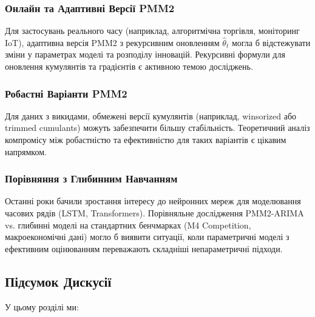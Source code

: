 \documentclass[12pt,a4paper]{article}
\begin{document}
	\subsubsection{Онлайн та Адаптивні Версії PMM2}
	
	Для застосувань реального часу (наприклад, алгоритмічна торгівля, моніторинг IoT), адаптивна версія PMM2 з рекурсивним оновленням $\hat{\theta}_t$ могла б відстежувати зміни у параметрах моделі та розподілу інновацій. Рекурсивні формули для оновлення кумулянтів та градієнтів є активною темою досліджень.
	
	\subsubsection{Робастні Варіанти PMM2}
	
	Для даних з викидами, обмежені версії кумулянтів (наприклад, winsorized або trimmed cumulants) можуть забезпечити більшу стабільність. Теоретичний аналіз компромісу між робастністю та ефективністю для таких варіантів є цікавим напрямком.
	
	\subsubsection{Порівняння з Глибинним Навчанням}
	
	Останні роки бачили зростання інтересу до нейронних мереж для моделювання часових рядів (LSTM, Transformers). Порівняльне дослідження PMM2-ARIMA vs. глибинні моделі на стандартних бенчмарках (M4 Competition, макроекономічні дані) могло б виявити ситуації, коли параметричні моделі з ефективним оцінюванням переважають складніші непараметричні підходи.
	
	\subsection{Підсумок Дискусії}
	\label{subsec:discussion_summary}
	
	У цьому розділі ми:
	
\end{document}
